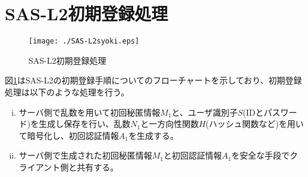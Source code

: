 \documentclass{thesis}
\begin{document}
\section{SAS-L2初期登録処理}
\begin{figure}[H]
 \center
 \texttt{[image: ./SAS-L2syoki.eps]}
 \caption{SAS-L2初期登録処理}
 \label{sasl2syoki}
\end{figure}
図\ref{sasl2syoki}はSAS-L2の初期登録手順についてのフローチャートを示しており、初期登録処理は以下のような処理を行う。
\begin{enumerate}[(i)]
\item サーバ側で乱数を用いて初回秘匿情報$M_1$と、ユーザ識別子$S$(IDとパスワード)を生成し保存を行い、乱数$N_1$と一方向性関数$H$(ハッシュ関数など)を用いて暗号化し、初回認証情報$A_1$を生成する。
\item サーバ側で生成された初回秘匿情報$M_1$と初回認証情報$A_1$を安全な手段でクライアント側と共有する。
\end{enumerate}
\end{document}
